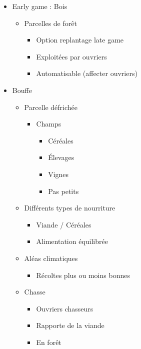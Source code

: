 \documentclass[
]{article}
\providecommand{\tightlist}{%
  \setlength{\itemsep}{0pt}\setlength{\parskip}{0pt}}
\begin{document}
\begin{itemize}
\tightlist
\item
  Early game : Bois

  \begin{itemize}
  \tightlist
  \item
    Parcelles de forêt

    \begin{itemize}
    \tightlist
    \item
      Option replantage late game
    \item
      Exploitées par ouvriers
    \item
      Automatisable (affecter ouvriers)
    \end{itemize}
  \end{itemize}
\item
  Bouffe

  \begin{itemize}
  \tightlist
  \item
    Parcelle défrichée

    \begin{itemize}
    \tightlist
    \item
      Champs

      \begin{itemize}
      \tightlist
      \item
        Céréales
      \item
        Élevages
      \item
        Vignes
      \item
        Pas petits
      \end{itemize}
    \end{itemize}
  \item
    Différents types de nourriture

    \begin{itemize}
    \tightlist
    \item
      Viande / Céréales
    \item
      Alimentation équilibrée
    \end{itemize}
  \item
    Aléas climatiques

    \begin{itemize}
    \tightlist
    \item
      Récoltes plus ou moins bonnes
    \end{itemize}
  \item
    Chasse

    \begin{itemize}
    \tightlist
    \item
      Ouvriers chasseurs
    \item
      Rapporte de la viande
    \item
      En forêt


\end{itemize}
\end{itemize}
\end{itemize}
\end{document}
